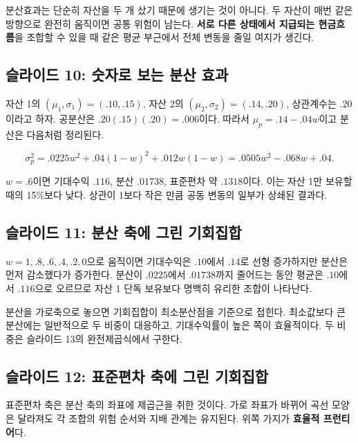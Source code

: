 \documentclass[11pt,a4paper]{article}
\begin{document}
분산효과는 단순히 자산을 두 개 샀기 때문에 생기는 것이 아니다. 두 자산이 매번 같은 방향으로 완전히 움직이면 공통 위험이 남는다. \textbf{서로 다른 상태에서 지급되는 현금흐름}을 조합할 수 있을 때 같은 평균 부근에서 전체 변동을 줄일 여지가 생긴다.
\par

\subsection{슬라이드 10: 숫자로 보는 분산 효과}

자산 1의 $(\mu_1,\sigma_1)=(.10,.15)$, 자산 2의 $(\mu_2,\sigma_2)=(.14,.20)$, 상관계수는 $.20$이라고 하자. 공분산은 $.20(.15)(.20)=.006$이다. 따라서 $\mu_p=.14-.04w$이고 분산은 다음처럼 정리된다.
\par

\[
\sigma_p^2=.0225w^2+.04(1-w)^2+.012w(1-w)=.0505w^2-.068w+.04.
\]

$w=.6$이면 기대수익 $.116$, 분산 $.01738$, 표준편차 약 $.1318$이다. 이는 자산 1만 보유할 때의 15\%보다 낮다. 상관이 1보다 작은 만큼 공동 변동의 일부가 상쇄된 결과다.
\par

\subsection{슬라이드 11: 분산 축에 그린 기회집합}

$w=1,.8,.6,.4,.2,0$으로 움직이면 기대수익은 $.10$에서 $.14$로 선형 증가하지만 분산은 먼저 감소했다가 증가한다. 분산이 $.0225$에서 $.01738$까지 줄어드는 동안 평균은 $.10$에서 $.116$으로 오르므로 자산 1 단독 보유보다 명백히 유리한 조합이 나타난다.
\par

분산을 가로축으로 놓으면 기회집합이 최소분산점을 기준으로 접힌다. 최소값보다 큰 분산에는 일반적으로 두 비중이 대응하고, 기대수익률이 높은 쪽이 효율적이다. 두 비중은 슬라이드 13의 완전제곱식에서 구한다.
\par

\subsection{슬라이드 12: 표준편차 축에 그린 기회집합}

표준편차 축은 분산 축의 좌표에 제곱근을 취한 것이다. 가로 좌표가 바뀌어 곡선 모양은 달라져도 각 조합의 위험 순서와 지배 관계는 유지된다. 위쪽 가지가 \textbf{효율적 프런티어}다.
\par
\end{document}
